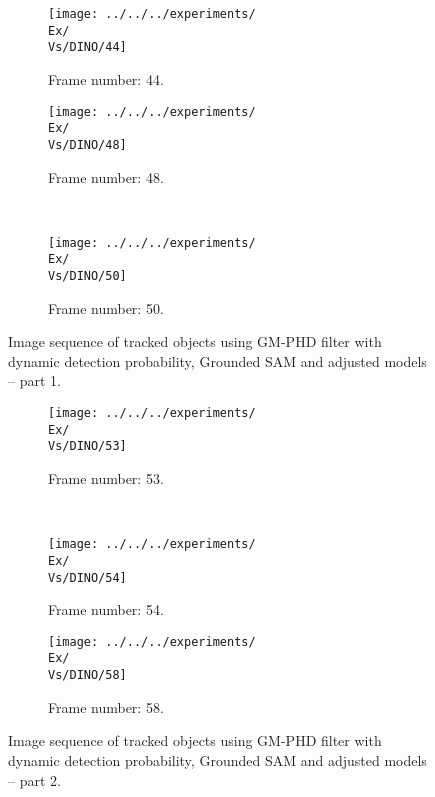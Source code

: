 \begin{figure}[H]
    \centering
    \begin{subfigure}{\textwidth}
        \centering
        \texttt{[image: ../../../experiments/\\Ex/\\Vs/DINO/44]}
        \caption{Frame number: 44.}
        \label{fig:\Ex-\Vs-\Set:01}
    \end{subfigure}
    \begin{subfigure}{\textwidth}
        \centering
        \texttt{[image: ../../../experiments/\\Ex/\\Vs/DINO/48]}
        \caption{Frame number: 48.}
        \label{fig:\Ex-\Vs-\Set:02}
    \end{subfigure}
    \\
    \begin{subfigure}{\textwidth}
        \centering
        \texttt{[image: ../../../experiments/\\Ex/\\Vs/DINO/50]}
        \caption{Frame number: 50.}
        \label{fig:\Ex-\Vs-\Set:03}
    \end{subfigure}
    \caption{Image sequence of tracked objects using GM-PHD filter with dynamic detection probability, Grounded SAM and adjusted models -- part 1.}
    \label{fig:\Ex-\Vs-\Set_1}
\end{figure}
\begin{figure}[H]

    \begin{subfigure}{\textwidth}
        \centering
        \texttt{[image: ../../../experiments/\\Ex/\\Vs/DINO/53]}
        \caption{Frame number: 53.}
        \label{fig:\Ex-\Vs-\Set:04}
    \end{subfigure}
    \\
    \begin{subfigure}{\textwidth}
        \centering
        \texttt{[image: ../../../experiments/\\Ex/\\Vs/DINO/54]}
        \caption{Frame number: 54.}
        \label{fig:\Ex-\Vs-\Set:05}
    \end{subfigure}
    \begin{subfigure}{\textwidth}
        \centering
        \texttt{[image: ../../../experiments/\\Ex/\\Vs/DINO/58]}
        \caption{Frame number: 58.}
        \label{fig:\Ex-\Vs-\Set:06}
    \end{subfigure}
    \caption{Image sequence of tracked objects using GM-PHD filter with dynamic detection probability, Grounded SAM and adjusted models -- part 2.}
    \label{fig:\Ex-\Vs-\Set_2}
\end{figure}



